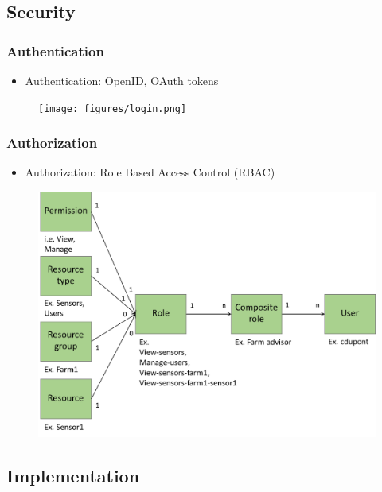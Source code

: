 \documentclass{beamer}
\begin{document}
\subsection{Security}

\begin{frame}
\frametitle{Authentication}
  
  \begin{itemize}
  \item Authentication: OpenID, OAuth tokens 
  \end{itemize}

  \begin{figure}
  \centering
  \texttt{[image: figures/login.png]}
  \end{figure}

\end{frame}

\begin{frame}
\frametitle{Authorization}
  
  \begin{itemize}
  \item Authorization: Role Based Access Control (RBAC)
  \end{itemize}

  \begin{figure}
  \centering
  \includegraphics[width=.8\linewidth]{figures/RBAC.png}
  \end{figure}

\end{frame}
\subsection{Implementation}
\end{document}
